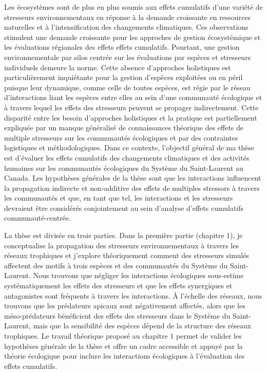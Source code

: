 Les écosystèmes sont de plus en plus soumis aux effets cumulatifs d'une
variété de stresseurs environnementaux en réponse à la demande
croissante en ressources naturelles et à l'intensification des
changements climatiques. Ces observations stimulent une demande
croissante pour les approches de gestion écosystémique et les
évaluations régionales des effets effets cumulatifs. Pourtant, une
gestion environnementale par silos centrée sur les évaluations par
espèces et stresseurs individuels demeure la norme. Cette absence
d'approches holistiques est particulièrement inquiétante pour la gestion
d'espèces exploitées ou en péril puisque leur dynamique, comme celle de
toutes espèces, est régie par le réseau d'interactions liant les espèces
entre elles au sein d'une communauté écologique et à travers lequel les
effets des stresseurs peuvent se propager indirectement. Cette disparité
entre les besoin d'approches holistiques et la pratique est
partiellement expliquée par un manque généralisé de connaissances
théorique des effets de multiple stresseurs sur les communautés
écologiques et par des contraintes logistiques et méthodologiques. Dans
ce contexte, l'objectif général de ma thèse est d'évaluer les effets
cumulatifs des changements climatiques et des activités humaines sur les
communautés écologiques du Système du Saint-Laurent au Canada. Les
hypothèses générales de la thèse sont que les interactions influencent
la propagation indirecte et non-additive des effets de multiples
stressors à travers les communautés et que, en tant que tel, les
interactions et les stresseurs devraient être considérés conjointement
au sein d'analyse d'effets cumulatifs communauté-centrée.

La thèse est divisée en trois parties. Dans la première partie (chapitre
1), je conceptualise la propagation des stresseurs environnementaux à
travers les réseaux trophiques et j'explore théoriquement comment des
stresseurs simulés affectent des motifs à trois espèces et des
communautés du Système du Saint-Laurent. Nous trouvons que négliger les
interactions écologiques sous-estime systématiquement les effets des
stresseurs et que les effets synergiques et antagonistes sont fréquents
à travers les interactions. À l'échelle des réseaux, nous trouvons que
les prédateurs apicaux sont négativement affectés, alors que les
méso-prédateurs bénéficient des effets des stresseurs dans le Système du
Saint-Laurent, mais que la sensibilité des espèces dépend de la
structure des réseaux trophiques. Le travail théorique proposé au
chapitre 1 permet de valider les hypothèses générale de la thèse et
offre un cadre accessible et appuyé par la théorie écologique pour
inclure les interactions écologiques à l'évaluation des effets
cumulatifs.

